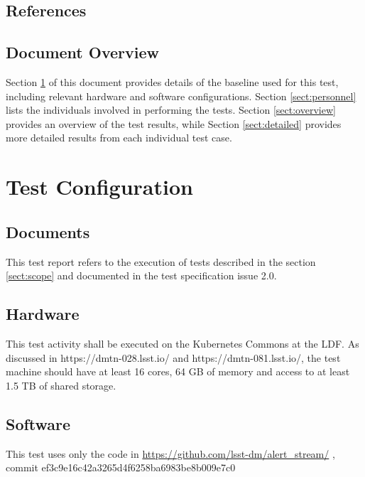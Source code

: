 \documentclass[DM,lsstdraft,STR,toc]{lsstdoc}
\begin{document}
\subsection{References}
\label{sect:references}

\renewcommand{\refname}{}


\subsection{Document Overview}
\label{sect:docoverview}

Section \ref{sect:configuration} of this document provides details of the \product{} baseline used for this test, including relevant hardware and software configurations.
Section \ref{sect:personnel} lists the individuals involved in performing the tests.
Section \ref{sect:overview} provides an overview of the test results, while Section \ref{sect:detailed} provides more detailed results from each individual test case.

\section{Test Configuration}
\label{sect:configuration}

\subsection{Documents}

This test report refers to the execution of tests described in the section \ref{sect:scope} and documented in the  test specification issue 2.0.

\subsection{Hardware}
\label{sect:hwconf}

This test activity shall be executed on the Kubernetes Commons at the LDF.
As discussed in https://dmtn-028.lsst.io/ and https://dmtn-081.lsst.io/, the test machine should have at least 16 cores, 64 GB of memory and access to at least 1.5 TB of shared storage.

\subsection{Software}
\label{sect:swconf}

This test uses only the code in 
\url{https://github.com/lsst-dm/alert_stream/} , commit ef3c9e16c42a3265d4f6258ba6983be8b009e7c0
\end{document}
